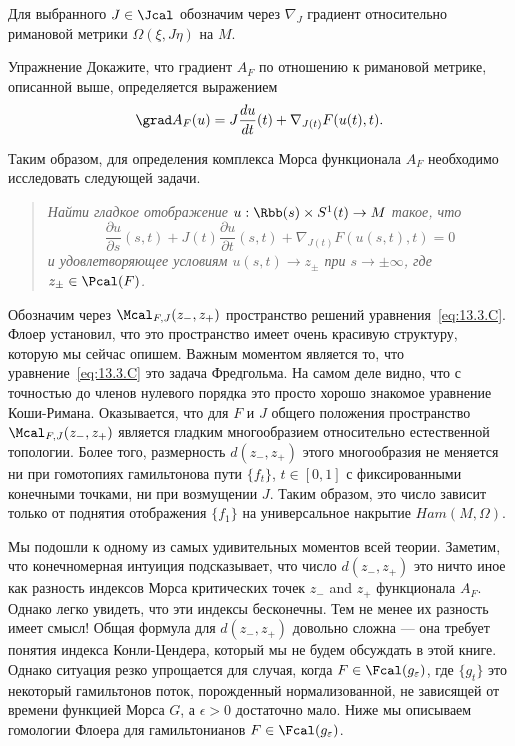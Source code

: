 Для выбранного $J\in\Jcal$ обозначим через $\nabla_{J}$ градиент
относительно римановой метрики $\Omega(\xi,J\eta)$ на $M$.
\begin{ex}{Упражнение}\label{13.3.B}
  Докажите, что градиент $A_{F}$ по отношению к римановой метрике,
  описанной выше, определяется выражением 
  \[
  \grad A_{F}(u)=J\frac{\d u}{\d t}(t)+\nabla_{J(t)}F(u(t),t).
  \]
\end{ex}
Таким образом, для определения комплекса Морса функционала $A_{F}$
необходимо исследовать  следующей задачи.
\begin{quote}\em
  Найти гладкое отображение $u : \Rbb(s)\times S^{1}(t)\to M$ такое,
  что
  \begin{equation}\label{eq:13.3.C}
    \frac{\partial u}{\partial s}(s,t) +
    J(t)\frac{\partial u}{\partial t}(s,t) +
    \nabla_{J(t)}F(u(s,t),t) = 0
  \end{equation}
  и удовлетворяющее условиям $u(s,t)\to z_{\pm}$ при $s\to\pm\infty$,
  где $z_{\pm}\in\Pcal(F)$.
\end{quote}
Обозначим через $\Mcal_{F,J}(z_{-},z_{+})$ пространство решений
уравнения~\ref{eq:13.3.C}. 
Флоер установил, что это пространство имеет очень красивую структуру,
которую мы сейчас опишем.
Важным моментом является то, что уравнение~\ref{eq:13.3.C} это задача Фредгольма.
На самом деле видно, что с точностью до членов нулевого порядка это
просто хорошо знакомое уравнение Коши-Римана. 
Оказывается, что для $F$ и $J$ общего положения пространство
$\Mcal_{F,J}(z_{-},z_{+})$ является гладким многообразием относительно
естественной топологии. 
Более того, размерность $d(z_{-}, z_{+})$ этого многообразия не
меняется ни при гомотопиях гамильтонова пути $\{f_{t}\}$, $t\in [0,1]$
с фиксированными конечными точками, ни при возмущении $J$.
Таким образом, это число зависит только от поднятия отображения
$\{f_{1}\}$ на универсальное накрытие $Ham(M, \Omega)$.

Мы подошли к одному из самых удивительных моментов всей теории.
Заметим, что конечномерная интуиция подсказывает, что число $d(z_{-},
z_{+})$ это ничто иное как разность индексов Морса критических точек
$z_{-}$ and $z_{+}$ функционала $A_{F}$.
Однако легко увидеть, что эти индексы бесконечны.
Тем не менее их разность имеет смысл! Общая формула для
$d(z_{-},z_{+})$ довольно сложна --- она требует понятия индекса
Конли-Цендера, который мы не будем обсуждать в этой книге.
Однако ситуация резко упрощается для случая, когда
$F\in\Fcal(g_{\epsilon})$, где $\{g_{t}\}$ это некоторый гамильтонов
поток, порожденный нормализованной, не зависящей от времени функцией
Морса $G$, а $\epsilon>0$ достаточно мало.
Ниже мы описываем гомологии Флоера для гамильтонианов
$F\in\Fcal(g_{\epsilon})$.

